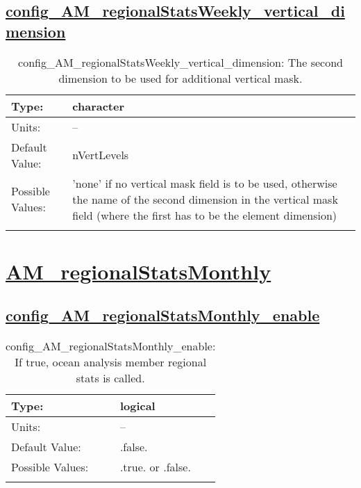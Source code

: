 \subsection[config\_AM\_regionalStatsWeekly\_vertical\_dimension]{\hyperref[sec:nm_tab_AM_regionalStatsWeekly]{config\_AM\_regionalStatsWeekly\_vertical\_dimension}}
\label{subsec:nm_sec_config_AM_regionalStatsWeekly_vertical_dimension}
\begin{center}
\begin{longtable}{| p{2.0in} || p{4.0in} |}
    \hline
    Type: & character \\
    \hline
    Units: & -- \\
    \hline
    Default Value: & nVertLevels \\
    \hline
    Possible Values: & 'none' if no vertical mask field is to be used, otherwise the name of the second dimension in the vertical mask field (where the first has to be the element dimension) \\
    \hline
    \caption{config\_AM\_regionalStatsWeekly\_vertical\_dimension: The second dimension to be used for additional vertical mask.}
\end{longtable}
\end{center}
\section[AM\_regionalStatsMonthly]{\hyperref[sec:nm_tab_AM_regionalStatsMonthly]{AM\_regionalStatsMonthly}}
\label{sec:nm_sec_AM_regionalStatsMonthly}
\subsection[config\_AM\_regionalStatsMonthly\_enable]{\hyperref[sec:nm_tab_AM_regionalStatsMonthly]{config\_AM\_regionalStatsMonthly\_enable}}
\label{subsec:nm_sec_config_AM_regionalStatsMonthly_enable}
\begin{center}
\begin{longtable}{| p{2.0in} || p{4.0in} |}
    \hline
    Type: & logical \\
    \hline
    Units: & -- \\
    \hline
    Default Value: & .false. \\
    \hline
    Possible Values: & .true. or .false. \\
    \hline
    \caption{config\_AM\_regionalStatsMonthly\_enable: If true, ocean analysis member regional stats is called.}
\end{longtable}
\end{center}
